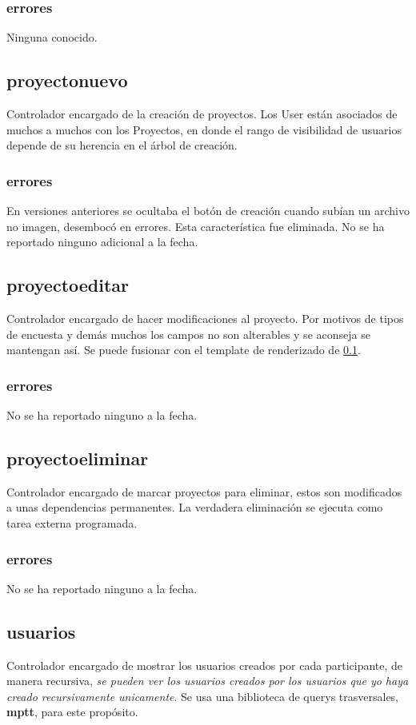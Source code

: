 \documentclass[10pt,a4paper]{book}
\begin{document}
	\subsubsection{errores}
	Ninguna conocido.


	\subsection{proyectonuevo}\label{proyectonuevo}
	Controlador encargado de la creación de proyectos. Los User están asociados de muchos a muchos con los Proyectos, en donde el rango de visibilidad de usuarios depende de su herencia en el árbol de creación.
	\subsubsection{errores}
	En versiones anteriores se ocultaba el botón de creación cuando subían un archivo no imagen, desembocó en errores. Esta característica fue eliminada. No se ha reportado ninguno adicional a la fecha.
	
	\subsection{proyectoeditar}
	Controlador encargado de hacer modificaciones al proyecto. Por motivos de tipos de encuesta y demás muchos los campos no son alterables y se aconseja se mantengan así. Se puede fusionar con el template de renderizado de \ref{proyectonuevo}.
	\subsubsection{errores}
	No se ha reportado ninguno a la fecha.

	\subsection{proyectoeliminar}
	Controlador encargado de marcar proyectos para eliminar, estos son modificados a unas dependencias permanentes. La verdadera eliminación se ejecuta como tarea externa programada.
	\subsubsection{errores}
	No se ha reportado ninguno a la fecha.

	\subsection{usuarios}
	Controlador encargado de mostrar los usuarios creados por cada participante, de manera recursiva, \textit{se pueden ver los usuarios creados por los usuarios que yo haya creado recursivamente unicamente}. Se usa una biblioteca de querys trasversales, \textbf{mptt}, para este propósito.
\end{document}
